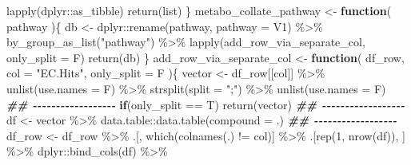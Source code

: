 \documentclass[
]{article}
\newenvironment{Shaded}{\begin{snugshade}}{\end{snugshade}}
\newcommand{\AttributeTok}[1]{\textcolor[rgb]{0.77,0.63,0.00}{#1}}
\newcommand{\ControlFlowTok}[1]{\textcolor[rgb]{0.13,0.29,0.53}{\textbf{#1}}}
\newcommand{\DecValTok}[1]{\textcolor[rgb]{0.00,0.00,0.81}{#1}}
\newcommand{\DocumentationTok}[1]{\textcolor[rgb]{0.56,0.35,0.01}{\textbf{\textit{#1}}}}
\newcommand{\FunctionTok}[1]{\textcolor[rgb]{0.00,0.00,0.00}{#1}}
\newcommand{\NormalTok}[1]{#1}
\newcommand{\OtherTok}[1]{\textcolor[rgb]{0.56,0.35,0.01}{#1}}
\newcommand{\SpecialCharTok}[1]{\textcolor[rgb]{0.00,0.00,0.00}{#1}}
\newcommand{\StringTok}[1]{\textcolor[rgb]{0.31,0.60,0.02}{#1}}
\begin{document}
\begin{Shaded}
\begin{Highlighting}[]
      \FunctionTok{lapply}\NormalTok{(dplyr}\SpecialCharTok{::}\NormalTok{as\_tibble)}
    \FunctionTok{return}\NormalTok{(list)}
\NormalTok{  \}}
\NormalTok{metabo\_collate\_pathway }\OtherTok{\textless{}{-}} 
  \ControlFlowTok{function}\NormalTok{(}
\NormalTok{           pathway}
\NormalTok{           )\{}
\NormalTok{    db }\OtherTok{\textless{}{-}}\NormalTok{ dplyr}\SpecialCharTok{::}\FunctionTok{rename}\NormalTok{(pathway, }\AttributeTok{pathway =}\NormalTok{ V1) }\SpecialCharTok{\%\textgreater{}\%} 
      \FunctionTok{by\_group\_as\_list}\NormalTok{(}\StringTok{"pathway"}\NormalTok{) }\SpecialCharTok{\%\textgreater{}\%} 
      \FunctionTok{lapply}\NormalTok{(add\_row\_via\_separate\_col, }\AttributeTok{only\_split =}\NormalTok{ F)}
    \FunctionTok{return}\NormalTok{(db)}
\NormalTok{  \}}
\NormalTok{add\_row\_via\_separate\_col }\OtherTok{\textless{}{-}} 
  \ControlFlowTok{function}\NormalTok{(}
\NormalTok{           df\_row,}
           \AttributeTok{col =} \StringTok{"EC.Hits"}\NormalTok{,}
           \AttributeTok{only\_split =}\NormalTok{ F}
\NormalTok{           )\{}
\NormalTok{    vector }\OtherTok{\textless{}{-}}\NormalTok{ df\_row[[col]] }\SpecialCharTok{\%\textgreater{}\%} 
      \FunctionTok{unlist}\NormalTok{(}\AttributeTok{use.names =}\NormalTok{ F) }\SpecialCharTok{\%\textgreater{}\%} 
      \FunctionTok{strsplit}\NormalTok{(}\AttributeTok{split =} \StringTok{";"}\NormalTok{) }\SpecialCharTok{\%\textgreater{}\%} 
      \FunctionTok{unlist}\NormalTok{(}\AttributeTok{use.names =}\NormalTok{ F)}
    \DocumentationTok{\#\# {-}{-}{-}{-}{-}{-}{-}{-}{-}{-}{-}{-}{-}{-}{-}{-}{-}{-} }
    \ControlFlowTok{if}\NormalTok{(only\_split }\SpecialCharTok{==}\NormalTok{ T)}
      \FunctionTok{return}\NormalTok{(vector)}
    \DocumentationTok{\#\# {-}{-}{-}{-}{-}{-}{-}{-}{-}{-}{-}{-}{-}{-}{-}{-}{-}{-} }
\NormalTok{    df }\OtherTok{\textless{}{-}}\NormalTok{ vector }\SpecialCharTok{\%\textgreater{}\%} 
\NormalTok{      data.table}\SpecialCharTok{::}\FunctionTok{data.table}\NormalTok{(}\AttributeTok{compound =}\NormalTok{ .)}
    \DocumentationTok{\#\# {-}{-}{-}{-}{-}{-}{-}{-}{-}{-}{-}{-}{-}{-}{-}{-}{-}{-}}
\NormalTok{    df\_row }\OtherTok{\textless{}{-}}\NormalTok{ df\_row }\SpecialCharTok{\%\textgreater{}\%}
\NormalTok{      .[, }\FunctionTok{which}\NormalTok{(}\FunctionTok{colnames}\NormalTok{(.) }\SpecialCharTok{!=}\NormalTok{ col)] }\SpecialCharTok{\%\textgreater{}\%}
\NormalTok{      .[}\FunctionTok{rep}\NormalTok{(}\DecValTok{1}\NormalTok{, }\FunctionTok{nrow}\NormalTok{(df)), ] }\SpecialCharTok{\%\textgreater{}\%} 
\NormalTok{      dplyr}\SpecialCharTok{::}\FunctionTok{bind\_cols}\NormalTok{(df) }\SpecialCharTok{\%\textgreater{}\%}

\end{Highlighting}
\end{Shaded}
\end{document}
